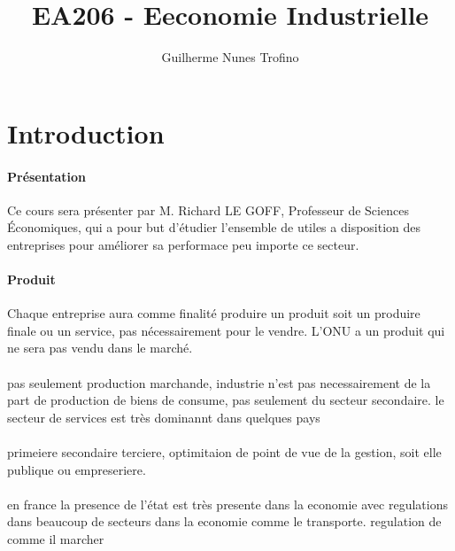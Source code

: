\documentclass{article}
\title{EA206 - Eeconomie Industrielle}
\author{Guilherme Nunes Trofino}
\begin{document}
\maketitle

\newpage\tableofcontents
\section{Introduction}
\paragraph{Présentation}Ce cours sera présenter par M. Richard LE GOFF, Professeur de Sciences Économiques, qui a pour but d'étudier l'ensemble de utiles a disposition des entreprises pour améliorer sa performace peu importe ce secteur.


\paragraph{Produit}Chaque entreprise aura comme finalité produire un produit soit un produire finale ou un service, pas nécessairement pour le vendre. L'ONU a un produit qui ne sera pas vendu dans le marché.


\paragraph{}pas seulement production marchande, industrie n'est pas necessairement de la part de production de biens de consume, pas seulement du secteur secondaire. le secteur de services est très dominannt dans quelques pays


\paragraph{}primeiere secondaire terciere, optimitaion de point de vue de la gestion, soit elle publique ou empreseriere.


\paragraph{}en france la presence de l'état est très presente dans la economie avec regulations dans beaucoup de secteurs dans la economie comme le transporte. regulation de comme il marcher
\end{document}
